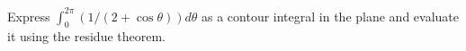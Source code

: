 Express $\int_0^{2\pi}(1/(2+\cos \theta))d\theta$ as a contour
integral in the plane and evaluate it using the residue theorem.
